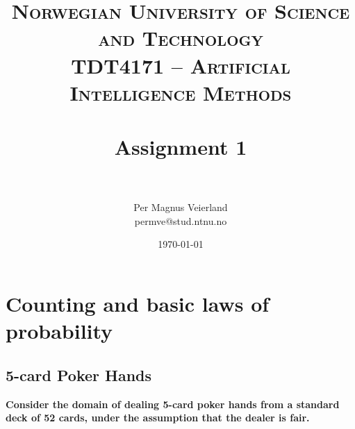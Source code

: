 

\title{	
\normalfont \normalsize 
\textsc{Norwegian University of Science and Technology\\TDT4171 -- Artificial Intelligence Methods} \\ [25pt]
\horrule{0.5pt} \\[0.4cm]
\huge Assignment 1 \\
\horrule{2pt} \\[0.5cm]
}

\renewcommand\thesection{\Roman{section}}
\renewcommand{\thesubsection}{\thesection.\arabic{section}}

\makeatletter
\renewcommand{\@seccntformat}[1]{\csname the#1\endcsname\quad}
\makeatother

\author{Per Magnus Veierland\\permve@stud.ntnu.no}

\date{\normalsize\today}


\maketitle

\section{Counting and basic laws of probability}

\subsection{5-card Poker Hands}

\textbf{Consider the domain of dealing 5-card poker hands from a standard deck of 52 cards, under the assumption that the dealer is fair.}

